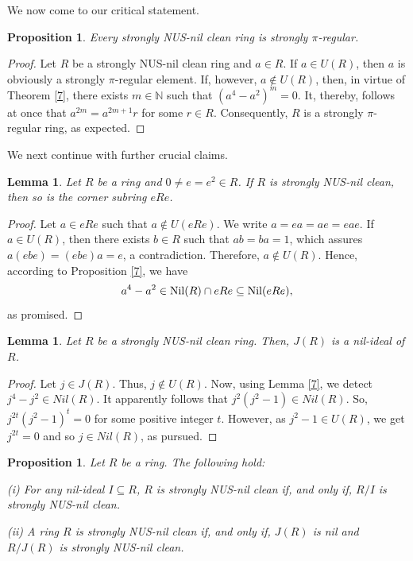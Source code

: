 \documentclass[12pt]{amsart}
\newtheorem{proposition}[theorem]{Proposition}
\newtheorem{lemma}[theorem]{Lemma}
\theoremstyle{definition}
\begin{document}
\medskip

We now come to our critical statement.

\begin{proposition}\label{2.12}
Every strongly NUS-nil clean ring is strongly $\pi$-regular.
\end{proposition}

\begin{proof}
Let $R$ be a strongly NUS-nil clean ring and $a \in R$. If $a \in U(R)$, then $a$ is obviously a strongly $\pi$-regular element. If, however, $a \notin U(R)$, then, in virtue of Theorem \ref{7}, there exists $m \in \mathbb{N}$ such that $(a^4-a^2)^m = 0$. It, thereby, follows at once that $a^{2m} = a^{2m+1}r$ for some $r \in R$. Consequently, $R$ is a strongly $\pi$-regular ring, as expected.
\end{proof}	

We next continue with further crucial claims.

\begin{lemma}\label{2.14}
Let $R$ be a ring and $0\neq e=e^2\in R$. If $R$ is strongly NUS-nil clean, then so is the corner subring $eRe$.
\end{lemma}

\begin{proof}
Let $a \in eRe$ such that $a\not\in U(eRe)$. We write $a = ea = ae = eae$. If $a \in U(R)$, then there exists $b \in R$ such that $ab = ba = 1$, which assures $a(ebe) = (ebe)a = e$, a contradiction. Therefore, $a \notin U(R)$. Hence, according to Proposition \ref{7}, we have $$a^4- a^2 \in {\rm Nil}(R) \cap eRe \subseteq {\rm Nil}(eRe),$$ as promised.
\end{proof}

\begin{lemma}\label{8}
Let $R$ be a strongly NUS-nil clean ring. Then, $J(R)$ is a nil-ideal of $R$.
\end{lemma}

\begin{proof} Let $j\in J(R)$. Thus, $j\not\in U(R)$. Now, using Lemma \ref{7}, we detect $j^4-j^2\in Nil(R)$. It apparently follows that $j^2(j^2-1)\in Nil(R)$. So, $j^{2t}(j^2-1)^t=0$ for some positive integer $t$. However, as $j^2-1\in U(R)$, we get $j^{2t}=0$ and so $j\in Nil(R)$, as pursued.
\end{proof}

\begin{proposition}\label{2.13}
Let $R$ be a ring. The following hold:	
\par
(i) For any nil-ideal $I \subseteq R$, $R$ is strongly NUS-nil clean if, and only if, $R/I$ is strongly NUS-nil clean.
\par
(ii) A ring $R$ is strongly NUS-nil clean if, and only if, $J(R)$ is nil and $R/J(R)$ is strongly NUS-nil clean.
\end{proposition}
\end{document}
